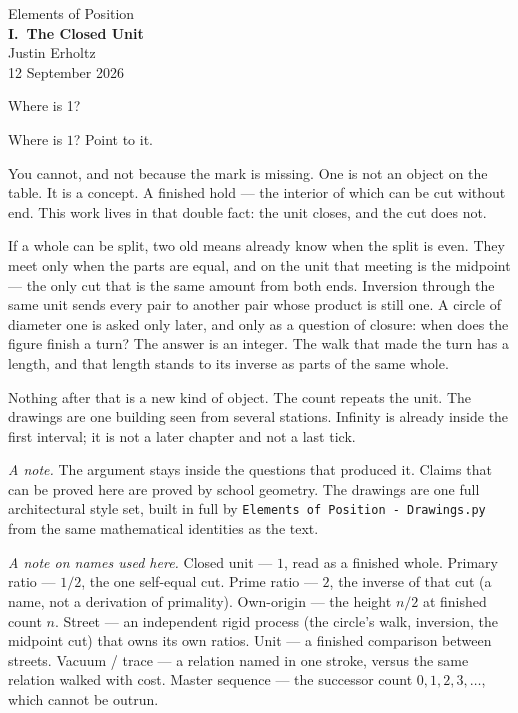 \documentclass[10pt,a4paper]{article}
\theoremstyle{plain}
\theoremstyle{definition}
\theoremstyle{remark}
\begin{document}
\begin{center}
\vspace*{2.2em}
{\large Elements of Position}\\[1.6em]
{\LARGE\bfseries I.\ The Closed Unit}\\[2.2em]
{\normalsize Justin Erholtz}\\[0.35em]
{\small 12 September 2026}
\end{center}

\vspace{2.4em}

\begin{center}
{\large Where is 1?}
\end{center}

\vspace{1.8em}

\noindent
Where is \(1\)? Point to it.

You cannot, and not because the mark is missing.
One is not an object on the table. It is a concept.
A finished hold --- the interior of which can be cut without end.
This work lives in that double fact: the unit closes, and the cut does not.

If a whole can be split, two old means already know when the split is even.
They meet only when the parts are equal, and on the unit that meeting is the midpoint --- the only cut that is the same amount from both ends.
Inversion through the same unit sends every pair to another pair whose product is still one.
A circle of diameter one is asked only later, and only as a question of closure: when does the figure finish a turn?
The answer is an integer.
The walk that made the turn has a length, and that length stands to its inverse as parts of the same whole.

Nothing after that is a new kind of object.
The count repeats the unit.
The drawings are one building seen from several stations.
Infinity is already inside the first interval; it is not a later chapter and not a last tick.

\vspace{1.4em}

\noindent
\textit{A note.}
The argument stays inside the questions that produced it.
Claims that can be proved here are proved by school geometry.
The drawings are one full architectural style set, built in full by \texttt{Elements of Position - Drawings.py} from the same mathematical identities as the text.

\vspace{0.9em}
\noindent
\textit{A note on names used here.}
Closed unit --- \(1\), read as a finished whole.
Primary ratio --- \(1/2\), the one self-equal cut.
Prime ratio --- \(2\), the inverse of that cut (a name, not a derivation of primality).
Own-origin --- the height \(n/2\) at finished count \(n\).
Street --- an independent rigid process (the circle's walk, inversion, the midpoint cut) that owns its own ratios.
Unit --- a finished comparison between streets.
Vacuum / trace --- a relation named in one stroke, versus the same relation walked with cost.
Master sequence --- the successor count \(0,1,2,3,\ldots\), which cannot be outrun.
\end{document}
